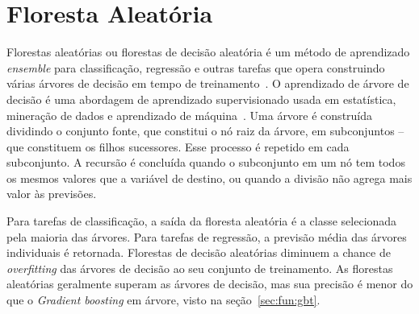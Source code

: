 \section{Floresta Aleatória}
\label{sec:fun:rf}

Florestas aleatórias ou florestas de decisão aleatória é um método de aprendizado \textit{ensemble} para classificação, regressão e outras tarefas que opera construindo várias árvores de decisão em tempo de treinamento~\cite{hotimkam}.
O aprendizado de árvore de decisão é uma abordagem de aprendizado supervisionado usada em estatística, mineração de dados e aprendizado de máquina~\cite{decisiontree}.
Uma árvore é construída dividindo o conjunto fonte, que constitui o nó raiz da árvore, em subconjuntos – que constituem os filhos sucessores.
Esse processo é repetido em cada subconjunto.
A recursão é concluída quando o subconjunto em um nó tem todos os mesmos valores que a variável de destino, ou quando a divisão não agrega mais valor às previsões.

Para tarefas de classificação, a saída da floresta aleatória é a classe selecionada pela maioria das árvores.
Para tarefas de regressão, a previsão média das árvores individuais é retornada.
Florestas de decisão aleatórias diminuem a chance de \textit{overfitting} das árvores de decisão ao seu conjunto de treinamento.
As florestas aleatórias geralmente superam as árvores de decisão, mas sua precisão é menor do que o \textit{Gradient boosting} em árvore, visto na seção~\ref{sec:fun:gbt}.
